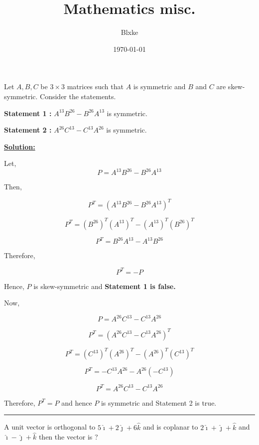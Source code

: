 \documentclass[twocolumn]{article}
\title{\textbf{Mathematics misc.}}
\author{ Blxke }
\date{\today}
\newcommand\bb[1]{\textcolor{yorhafg}{\textbf{#1}}}
\begin{document}
\maketitle    

\begin{question}
    \begin{small}
         Let \(A, B, C\) be \( 3\times 3 \) matrices such that \(A\) is symmetric and \( B\) and \( C\) are skew-symmetric. Consider the statements.

        \bb{Statement 1 : } \(A^{13} B^{26} - B^{26}A^{13}  \) is symmetric. 

        \bb{Statement 2 : } \(A^{26} C^{13}  - C^{13} A^{26}  \) is symmetric.     
    \end{small}
\end{question}


\vspace*{0.1in}

\bb{\underline{Solution: }} 

Let, 
\[
    P = A^{13} B^{26} - B^{26}A^{13}
\]

Then,

\[
     P^T = (A^{13} B^{26} - B^{26}A^{13})^T
\]

\[
    P^T = (B^{26})^T (A^{13})^T - (A^{13})^T (B^{26})^T    
\]

\[
    P^T = B^{26}A^{13} - A^{13} B^{26}  
\]

Therefore, 

\[
    P^T = -P 
\]

Hence, \(P\) is skew-symmetric and \textbf{Statement 1 is false.} 

Now, 

\[
    P = A^{26} C^{13}  - C^{13} A^{26}
\]

\[
    P^T = (A^{26} C^{13}  - C^{13} A^{26})^T
\]

\[
    P^T = (C^{13})^T (A^{26} )^T - (A^{26})^T (C^{13} )^T
\]

\[
    P^T = -C^{13} A^{26} - A^{26} (-C^{13} )
\]

\[
    P^T = A^{26} C^{13}  - C^{13} A^{26}
\]

Therefore, \(P^T = P\) and hence \(P\) is symmetric and Statement 2 is true. 

\vspace*{0.1in}

\hrule

\vspace*{0.1in}

\begin{question}
    A unit vector is orthogonal to \(5 \hat{\imath}  + 2 \hat{\jmath} + 6\hat{k} \)  and is coplanar to \(2 \hat{\imath}  + \hat{\jmath}  + \hat{k} \) and \(\hat{\imath} -\hat{\jmath} +\hat{k} \) then the vector is ?  
\end{question}
\end{document}
